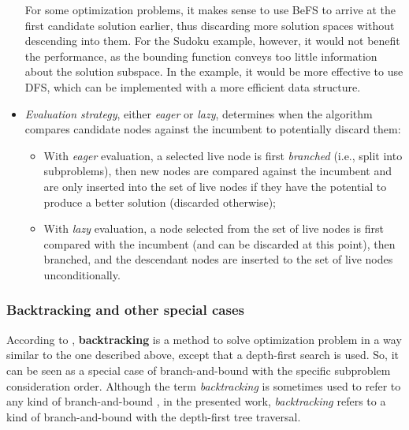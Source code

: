 \begin{itemize}
        For some optimization problems, it makes sense to use BeFS to arrive at the first
        candidate solution earlier, thus discarding more solution spaces without
        descending into them.
        For the Sudoku example, however, it would not benefit the performance, as the bounding
        function conveys too little information about the solution subspace.
        In the example, it would be more effective to use DFS, which can be implemented
        with a more efficient data structure.

    \item \emph{Evaluation strategy}, either \emph{eager} or \emph{lazy}, determines when the
        algorithm compares candidate nodes against the incumbent to potentially discard them:
        \begin{itemize}
            \item With \emph{eager} evaluation, a selected live node is first \emph{branched}
                (i.e., split into subproblems), then
                new nodes are compared against the incumbent and are only inserted into the set
                of live nodes if they have the potential to produce a better solution
                (discarded otherwise);
            \item With \emph{lazy} evaluation, a node selected from the set of live nodes is first compared
                with the incumbent (and can be discarded at this point), then branched,
                and the descendant nodes are inserted to the set of live nodes unconditionally.
        \end{itemize}
\end{itemize}

\subsubsection{Backtracking and other special cases}

According to \cite{shilov2012verifmono, indriyono2024sudoku}, \textbf{backtracking}
is a method to solve optimization problem in a way similar to the one described above, except
that a depth-first search is used. So, it can be seen as a special case of branch-and-bound
with the specific subproblem consideration order. Although the term \emph{backtracking} is
sometimes used to refer to any kind of branch-and-bound \cite{finkel1987distrib},
in the presented work, \emph{backtracking} refers to a kind of branch-and-bound with the
depth-first tree traversal.

